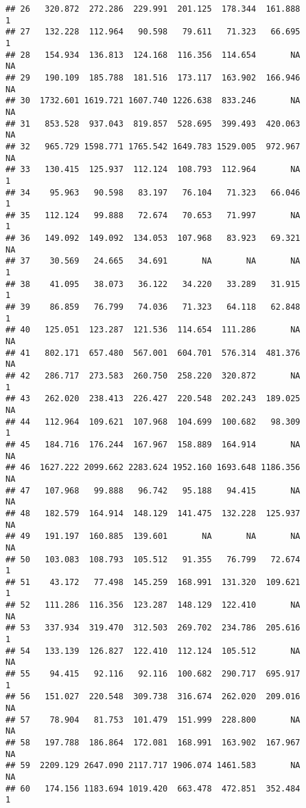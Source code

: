 \documentclass[
]{article}
\begin{document}
\begin{verbatim}
## 26   320.872  272.286  229.991  201.125  178.344  161.888             1
## 27   132.228  112.964   90.598   79.611   71.323   66.695             1
## 28   154.934  136.813  124.168  116.356  114.654       NA            NA
## 29   190.109  185.788  181.516  173.117  163.902  166.946            NA
## 30  1732.601 1619.721 1607.740 1226.638  833.246       NA            NA
## 31   853.528  937.043  819.857  528.695  399.493  420.063            NA
## 32   965.729 1598.771 1765.542 1649.783 1529.005  972.967            NA
## 33   130.415  125.937  112.124  108.793  112.964       NA             1
## 34    95.963   90.598   83.197   76.104   71.323   66.046             1
## 35   112.124   99.888   72.674   70.653   71.997       NA             1
## 36   149.092  149.092  134.053  107.968   83.923   69.321            NA
## 37    30.569   24.665   34.691       NA       NA       NA             1
## 38    41.095   38.073   36.122   34.220   33.289   31.915             1
## 39    86.859   76.799   74.036   71.323   64.118   62.848             1
## 40   125.051  123.287  121.536  114.654  111.286       NA            NA
## 41   802.171  657.480  567.001  604.701  576.314  481.376            NA
## 42   286.717  273.583  260.750  258.220  320.872       NA             1
## 43   262.020  238.413  226.427  220.548  202.243  189.025            NA
## 44   112.964  109.621  107.968  104.699  100.682   98.309             1
## 45   184.716  176.244  167.967  158.889  164.914       NA            NA
## 46  1627.222 2099.662 2283.624 1952.160 1693.648 1186.356            NA
## 47   107.968   99.888   96.742   95.188   94.415       NA            NA
## 48   182.579  164.914  148.129  141.475  132.228  125.937            NA
## 49   191.197  160.885  139.601       NA       NA       NA            NA
## 50   103.083  108.793  105.512   91.355   76.799   72.674             1
## 51    43.172   77.498  145.259  168.991  131.320  109.621             1
## 52   111.286  116.356  123.287  148.129  122.410       NA            NA
## 53   337.934  319.470  312.503  269.702  234.786  205.616             1
## 54   133.139  126.827  122.410  112.124  105.512       NA            NA
## 55    94.415   92.116   92.116  100.682  290.717  695.917             1
## 56   151.027  220.548  309.738  316.674  262.020  209.016            NA
## 57    78.904   81.753  101.479  151.999  228.800       NA            NA
## 58   197.788  186.864  172.081  168.991  163.902  167.967            NA
## 59  2209.129 2647.090 2117.717 1906.074 1461.583       NA            NA
## 60   174.156 1183.694 1019.420  663.478  472.851  352.484             1

\end{verbatim}
\end{document}
